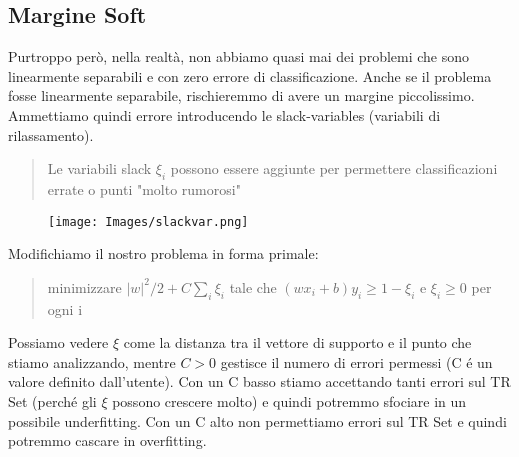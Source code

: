 \documentclass{article}
\begin{document}
\subsection{Margine Soft}
Purtroppo però, nella realtà, non abbiamo quasi mai dei problemi che sono linearmente separabili e con zero errore di classificazione. Anche se il problema fosse linearmente separabile, rischieremmo di avere un margine piccolissimo. Ammettiamo quindi errore introducendo le slack-variables (variabili di rilassamento). 
\begin{quote}
    Le variabili slack $\xi_i$ possono essere aggiunte per permettere classificazioni errate o punti "molto rumorosi"
\end{quote}
\begin{figure}[H]
\centering
\texttt{[image: Images/slackvar.png]}
\end{figure}
\clearpage
Modifichiamo il nostro problema in forma primale: 
\begin{quote}
    minimizzare $|w|^2/2+C\sum_i\xi_i$ tale che $(wx_i+b)y_i\geq 1-\xi_i$ e $\xi_i\geq0$ per ogni i
\end{quote}
Possiamo vedere $\xi$ come la distanza tra il vettore di supporto e il punto che stiamo analizzando, mentre $C>0$ gestisce il numero di errori permessi (C é un valore definito dall'utente). Con un C basso stiamo accettando tanti errori sul TR Set (perché gli $\xi$ possono crescere molto) e quindi potremmo sfociare in un possibile underfitting. Con un C alto non permettiamo errori sul TR Set e quindi potremmo cascare in overfitting. 
\end{document}
